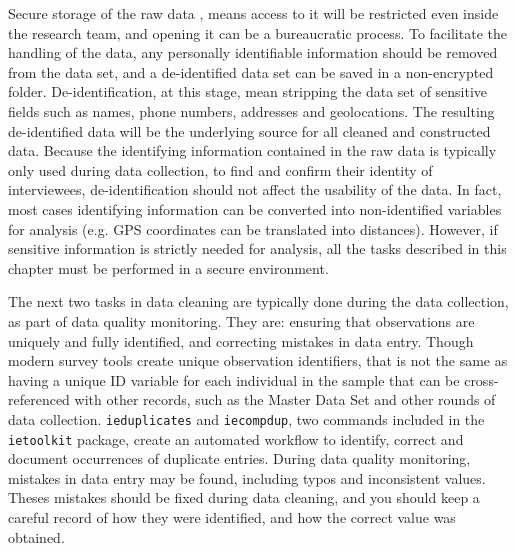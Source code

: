 Secure storage of the raw data
,
means access to it will be restricted even inside the research team,
and opening it can be a bureaucratic process.
To facilitate the handling of the data,
any personally identifiable information should be removed from the data set,
and a de-identified data set can be saved in a non-encrypted folder.
De-identification, at this stage, mean stripping the data set of sensitive fields 
such as names, phone numbers, addresses and geolocations.
The resulting de-identified data will be the underlying source
for all cleaned and constructed data.
Because the identifying information contained in the raw data
is typically only used during data collection, 
to find and confirm their identity of interviewees,
de-identification should not affect the usability of the data.
In fact, most cases identifying information can be converted 
into non-identified variables for analysis
(e.g. GPS coordinates can be translated into distances). 
However, if sensitive information is strictly needed for analysis, 
all the tasks described in this chapter must be performed in a secure environment.


The next two tasks in data cleaning are typically done during the data collection,
as part of data quality monitoring. 
They are: ensuring that observations are uniquely and fully identified,
and correcting mistakes in data entry.
Though modern survey tools create unique observation identifiers,
that is not the same as having a unique ID variable for each individual in the sample
that can be cross-referenced with other records, such as the Master Data Set
and other rounds of data collection.
\texttt{ieduplicates} and \texttt{iecompdup}, 
two commands  included in the \texttt{ietoolkit} package,
create an automated workflow to identify, correct and document
occurrences of duplicate entries. 
During data quality monitoring, mistakes in data entry may be found,
including typos and inconsistent values.
Theses mistakes should be fixed during data cleaning,
and you should keep a careful record of how they were identified, and
how the correct value was obtained.

